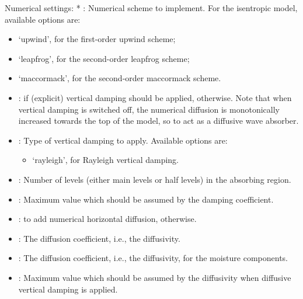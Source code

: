 \documentclass[letterpaper,10pt,english]{sphinxmanual}
\begin{document}
Numerical settings:
* : Numerical scheme to implement. For the isentropic model, available options are:
\begin{itemize}
\item {} 
‘upwind’, for the first-order upwind scheme;

\item {} 
‘leapfrog’, for the second-order leapfrog scheme;

\item {} 
‘maccormack’, for the second-order maccormack scheme.

\end{itemize}
\begin{itemize}
\item {} 
:  if (explicit) vertical damping should be applied,  otherwise.       Note that when vertical damping is switched off, the numerical diffusion is monotonically increased towards     the top of the model, so to act as a diffusive wave absorber.

\item {} 
: Type of vertical damping to apply. Available options are:
\begin{itemize}
\item {} 
‘rayleigh’, for Rayleigh vertical damping.

\end{itemize}

\item {} 
: Number of levels (either main levels or half levels) in the absorbing region.

\item {} 
: Maximum value which should be assumed by the damping coefficient.

\item {} 
:  to add numerical horizontal diffusion,  otherwise.

\item {} 
: The diffusion coefficient, i.e., the diffusivity.

\item {} 
: The diffusion coefficient, i.e., the diffusivity, for the moisture components.

\item {} 
: Maximum value which should be assumed by the diffusivity when diffusive vertical damping is applied.

\end{itemize}
\end{document}
